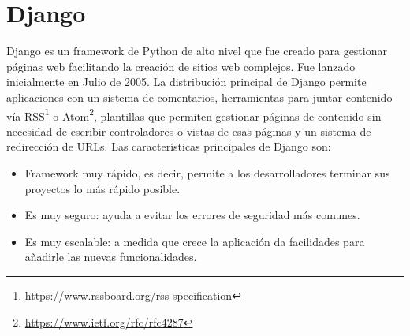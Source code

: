 \documentclass[a4paper, 12pt]{book}
\begin{document}
\section{Django}
\label{sec:django}
Django es un framework de Python de alto nivel que fue creado para gestionar páginas web facilitando la creación de sitios web complejos. Fue lanzado inicialmente en Julio de 2005. 
La distribución principal de Django permite aplicaciones con un sistema de comentarios, herramientas para juntar contenido vía RSS\footnote{\url{https://www.rssboard.org/rss-specification}} o Atom\footnote{\url{https://www.ietf.org/rfc/rfc4287}}, plantillas que permiten gestionar páginas de contenido sin necesidad de escribir controladores o vistas de esas páginas  y un sistema de redirección de URLs.
Las características principales de Django son:
\begin{itemize}
	\item Framework muy rápido, es decir, permite a los desarrolladores terminar sus proyectos lo más rápido posible.
	\item Es muy seguro: ayuda a evitar los errores de seguridad más comunes.
	\item Es muy escalable: a medida que crece la aplicación da facilidades para añadirle las nuevas funcionalidades.
\end{itemize} 
\end{document}
